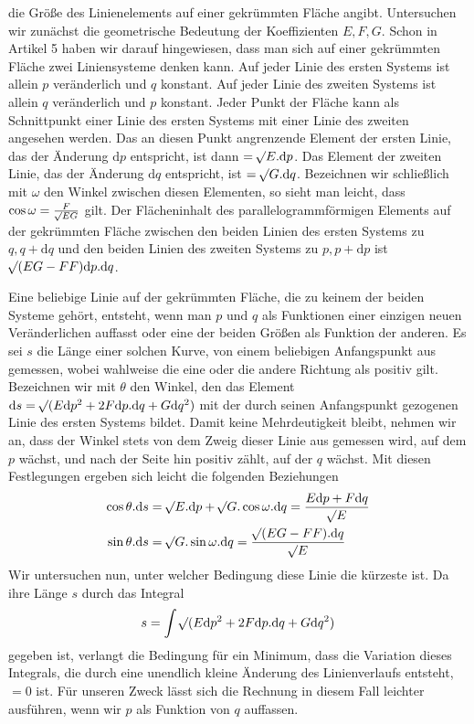 %
die Größe des Linienelements auf einer gekrümmten Fläche angibt. Untersuchen wir zunächst die geometrische Bedeutung der Koeffizienten \(E,F,G\). Schon in Artikel 5 haben wir darauf hingewiesen, dass man sich auf einer gekrümmten Fläche zwei Liniensysteme denken kann. Auf jeder Linie des ersten Systems ist allein \(p\) veränderlich und \(q\) konstant. Auf jeder Linie des zweiten Systems ist allein \(q\) veränderlich und \(p\) konstant. Jeder Punkt der Fläche kann als Schnittpunkt einer Linie des ersten Systems mit einer Linie des zweiten angesehen werden. Das an diesen Punkt angrenzende Element der ersten Linie, das der Änderung \(\mathrm{d}p\) entspricht, ist dann \(=\mathord{{}^{}\!\surd}E\mathord{.}\mathrm{d}p\). Das Element der zweiten Linie, das der Änderung \(\mathrm{d}q\) entspricht, ist \(=\mathord{{}^{}\!\surd}G\mathord{.}\mathrm{d}q\). Bezeichnen wir schließlich mit \(\omega\) den Winkel zwischen diesen Elementen, so sieht man leicht, dass \(\cos\omega=\frac{F}{\mathord{{}^{}\!\surd}EG}\) gilt. Der Flächeninhalt des parallelogrammförmigen Elements auf der gekrümmten Fläche zwischen den beiden Linien des ersten Systems zu \(q,q+\mathrm{d}q\) und den beiden Linien des zweiten Systems zu \(p,p+\mathrm{d}p\) ist \(\mathord{{}^{}\!\surd}(EG-FF)\mathrm{d}p\mathord{.}\mathrm{d}q\).

Eine beliebige Linie auf der gekrümmten Fläche, die zu keinem der beiden Systeme gehört, entsteht, wenn man \(p\) und \(q\) als Funktionen einer einzigen neuen Veränderlichen auffasst oder eine der beiden Größen als Funktion der anderen. Es sei \(s\) die Länge einer solchen Kurve, von einem beliebigen Anfangspunkt aus gemessen, wobei wahlweise die eine oder die andere Richtung als positiv gilt. Bezeichnen wir mit \(\theta\) den Winkel, den das Element \(\mathrm{d}s=\mathord{{}^{}\!\surd}(E\mathrm{d}p^2+2F\mathrm{d}p\mathord{.}\mathrm{d}q+G\mathrm{d}q^2)\) mit der durch seinen Anfangspunkt gezogenen Linie des ersten Systems bildet. Damit keine Mehrdeutigkeit bleibt, nehmen wir an, dass der Winkel stets von dem Zweig dieser Linie aus gemessen wird, auf dem \(p\) wächst, und nach der Seite hin positiv zählt, auf der \(q\) wächst. Mit diesen Festlegungen ergeben sich leicht die folgenden Beziehungen
\[
\begin{aligned}
\cos\theta\mathord{.}\mathrm{d}s&=\mathord{{}^{}\!\surd}E\mathord{.}\mathrm{d}p+\mathord{{}^{}\!\surd}G\mathord{.}\cos\omega\mathord{.}\mathrm{d}q=\frac{E\mathrm{d}p+F\mathrm{d}q}{\mathord{{}^{}\!\surd}E}\\
\sin\theta\mathord{.}\mathrm{d}s&=\mathord{{}^{}\!\surd}G\mathord{.}\sin\omega\mathord{.}\mathrm{d}q=\frac{\mathord{{}^{}\!\surd}(EG-FF)\mathord{.}\mathrm{d}q}{\mathord{{}^{}\!\surd}E}
\end{aligned}
\]
Wir untersuchen nun, unter welcher Bedingung diese Linie die kürzeste ist. Da ihre Länge \(s\) durch das Integral
\[
s=\int\mathord{{}^{}\!\surd}(E\mathrm{d}p^2+2F\mathrm{d}p\mathord{.}\mathrm{d}q+G\mathrm{d}q^2)
\]
gegeben ist, verlangt die Bedingung für ein Minimum, dass die Variation dieses Integrals, die durch eine unendlich kleine Änderung des Linienverlaufs entsteht, \(=0\) ist. Für unseren Zweck lässt sich die Rechnung in diesem Fall leichter ausführen, wenn wir \(p\) als Funktion von \(q\) auffassen.
